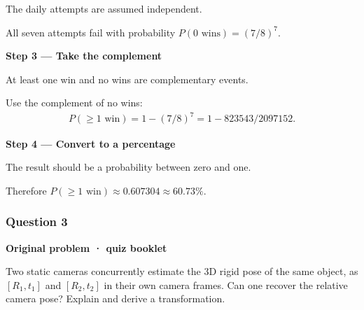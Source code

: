 \documentclass[letterpaper,11pt,english,openany,oneside]{jupyterBook}
\begin{document}
\sphinxAtStartPar
{} The daily attempts are assumed independent.

\sphinxAtStartPar
All seven attempts fail with probability {\color{QuizMathBlue} \(P(0\text{ wins})=(7/8)^7\)}.

\par

\par\medskip{}
{\color{QuizStepRed}\bfseries Step 3 — Take the complement}\par\smallskip

\sphinxAtStartPar
{} At least one win and no wins are complementary events.

\sphinxAtStartPar
Use the complement of no wins:
{\color{QuizMathBlue} \begin{equation*}
\begin{split}
P(\ge1\text{ win})=1-(7/8)^7=1-823543/2097152.
\end{split}
\end{equation*}}
\par

\par\medskip{}
{\color{QuizStepRed}\bfseries Step 4 — Convert to a percentage}\par\smallskip

\sphinxAtStartPar
{} The result should be a probability between zero and one.

\sphinxAtStartPar
Therefore {\color{QuizMathBlue} \(\boxed{P(\ge1\text{ win})\approx0.607304\approx60.73\%}\)}.

\par


\subsubsection{Question 3}
\label{\detokenize{lectures/lecture01/quiz-workbook:question-3}}\label{\detokenize{lectures/lecture01/quiz-workbook:quiz-17-q3}}\label{\detokenize{lectures/lecture01/quiz-workbook:ex-lec01-relative-pose}}
\par\medskip\textbf{Original problem · quiz booklet}\par\smallskip

\sphinxAtStartPar
Two static cameras concurrently estimate the 3D rigid pose of the same object, as \([R_1,t_1]\) and \([R_2,t_2]\) in their own camera frames. Can one recover the relative camera pose? Explain and derive a transformation.
\end{document}
